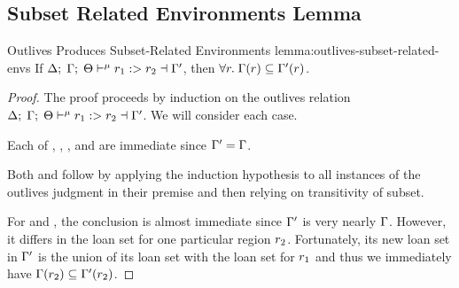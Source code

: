 \subsection{Subset Related Environments Lemma}
\label{sec:subset-related-lemmas}

\begin{oxlemma}{Outlives Produces Subset-Related Environments}
  {lemma:outlives-subset-related-envs}
  If $\Delta; \; \Gamma; \; \Theta \vdash^{\mu} r_1 :> r_2 \dashv \Gamma^\prime$, then
  $\forall r. \; \Gamma(r) \subseteq \Gamma^\prime(r)$.
\end{oxlemma}

\begin{proof}
  The proof proceeds by induction on the outlives relation $\Delta; \; \Gamma; \; \Theta \vdash^{\mu} r_1 :> r_2 \dashv \Gamma^\prime$. We will consider each case.

  \vspace{1em}
  \noindent \framebox[\textwidth]{
    \figuresize
    \begin{mathpar}
      \UReflProv \and \UAbsProvs \and \OLocalAbsProvs \and \UCheckLocalProvs
    \end{mathpar}
  }
  \vspace{1em}

  Each of , ,
  , and  are immediate
  since $\Gamma^\prime = \Gamma$.

  \vspace{1em}
  \noindent \framebox[\textwidth]{
    \figuresize
    \begin{mathpar}
      \UTransProv \and \OAbsLocalProvs
    \end{mathpar}
  }
  \vspace{1em}

  Both  and  follow by applying the induction
  hypothesis to all instances of the outlives judgment in their premise and then relying
  on transitivity of subset.

  \vspace{1em}
  \noindent \framebox[\textwidth]{
    \figuresize
    \begin{mathpar}
      \UCombineLocalProvs \and \UCombineLocalProvsUnrest
    \end{mathpar}
  }
  \vspace{1em}

  For  and ,
  the conclusion is almost immediate since $\Gamma^\prime$ is very nearly
  $\Gamma$. However, it differs in the loan set for one particular region
  $r_2$. Fortunately, its new loan set in $\Gamma^\prime$ is the union
  of its loan set with the loan set for $r_1$ and thus we immediately
  have $\Gamma(r_2) \subseteq \Gamma^\prime(r_2)$.
\end{proof}

